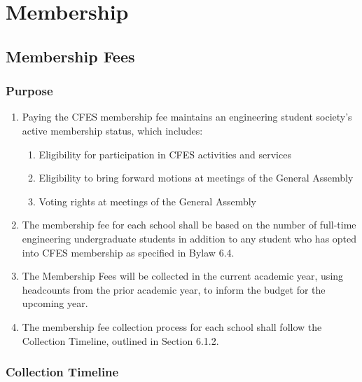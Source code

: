 \section{Membership}
\label{membership}

\subsection{Membership Fees}
\label{membership-fees}

\subsubsection{Purpose}
\label{membership-fees-purpose}

\begin{enumerate}
 \item
  Paying the CFES membership fee maintains an engineering student society's active membership status, which includes:
  \begin{enumerate}
   \item
    Eligibility for participation in CFES activities and services
   \item
    Eligibility to bring forward motions at meetings of the General Assembly
   \item
    Voting rights at meetings of the General Assembly
  \end{enumerate}
 \item
  The membership fee for each school shall be based on the number of full-time engineering undergraduate students in addition to any student who has opted into CFES membership as specified in Bylaw 6.4.
 \item
  The Membership Fees will be collected in the current academic year, using headcounts from the prior academic year, to inform the budget for the upcoming year.
 \item
  The membership fee collection process for each school shall follow the Collection Timeline, outlined in Section 6.1.2.
\end{enumerate}

\subsubsection{Collection Timeline}
\label{collection-timeline}

